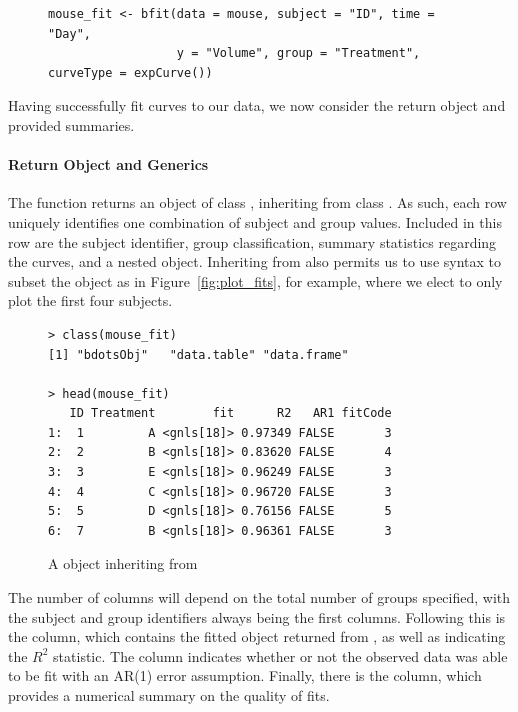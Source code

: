 \begin{singlespace}
\begin{figure}[H]
\centering
\begin{BVerbatim}
mouse_fit <- bfit(data = mouse, subject = "ID", time = "Day", 
                  y = "Volume", group = "Treatment", curveType = expCurve())
\end{BVerbatim}
\label{fig:bfit_example}
\end{figure}
\end{singlespace}

Having successfully fit curves to our data, we now consider the return object and provided summaries. 


\paragraph{Return Object and Generics}

The function  returns an object of class , inheriting from class . As such, each row uniquely identifies one combination of subject and group values. Included in this row are the subject identifier, group classification, summary statistics regarding the curves, and a nested  object. Inheriting from  also permits us to use  syntax to subset the object as in Figure~\ref{fig:plot_fits}, for example, where we elect to only plot the first four subjects.

\begin{singlespace}
\begin{figure}[H]
\centering
\begin{BVerbatim}
> class(mouse_fit)
[1] "bdotsObj"   "data.table" "data.frame"

> head(mouse_fit)
   ID Treatment        fit      R2   AR1 fitCode
1:  1         A <gnls[18]> 0.97349 FALSE       3
2:  2         B <gnls[18]> 0.83620 FALSE       4
3:  3         E <gnls[18]> 0.96249 FALSE       3
4:  4         C <gnls[18]> 0.96720 FALSE       3
5:  5         D <gnls[18]> 0.76156 FALSE       5
6:  7         B <gnls[18]> 0.96361 FALSE       3
\end{BVerbatim}
\caption{A  object inheriting from }
\label{fig:bdotsObj}
\end{figure}
\end{singlespace}

The number of columns will depend on the total number of groups specified, with the subject and group identifiers always being the first columns. Following this is the  column, which contains the fitted object returned from , as well as  indicating the $R^2$ statistic. The  column indicates whether or not the observed data was able to be fit with an AR(1) error assumption. Finally, there is the  column, which provides a numerical summary on the quality of fits.

